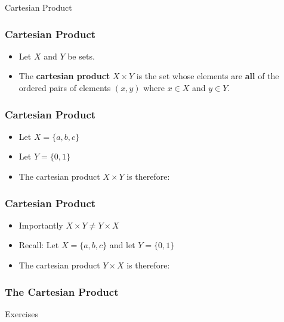 \documentclass{beamer}
\begin{document}
\begin{frame}
\begin{center}
{ \Huge
Cartesian Product }
\\
\bigskip
{ \Large
}
\end{center}
\end{frame}

\begin{frame}
\frametitle{Cartesian Product}
{\LARGE
\begin{itemize}
\item Let $X$ and $Y$ be sets.
\item The \textbf{cartesian product} $X \times Y$ is the set whose elements are \textbf{all} of the ordered pairs of elements $(x,y)$ where $x \in X$ and $y \in Y$.
\end{itemize}
}


\end{frame}


\begin{frame}
\vspace{-1.9cm}
\frametitle{Cartesian Product}
{\LARGE
\begin{itemize}
\item Let $X = \{a,b,c\}$
\item Let $Y = \{0,1\}$ 
\item The cartesian product $X \times Y$ is therefore:
\end{itemize}
}
\end{frame}

\begin{frame}
\vspace{-1.9cm}
\frametitle{Cartesian Product}
{\LARGE
\begin{itemize}
\item Importantly $X \times Y \neq Y \times X$
\item Recall: Let $X = \{a,b,c\}$ and let $Y = \{0,1\}$ 
\item The cartesian product $Y \times X$ is therefore:
\end{itemize}
}



\end{frame}



\begin{frame}
\frametitle{The Cartesian Product}
Exercises
\end{frame}
\end{document}
